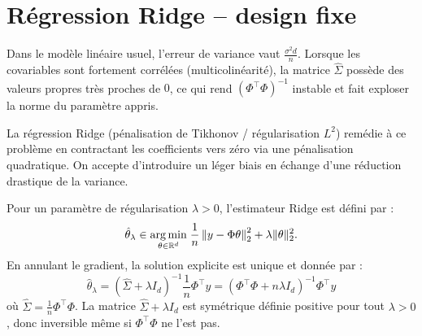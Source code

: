 
\section{Régression Ridge -- design fixe}

Dans le modèle linéaire usuel, l'erreur de variance vaut $\frac{\sigma^2 d}{n}$. Lorsque les covariables sont fortement corrélées (multicolinéarité), la matrice $\hat{\Sigma}$ possède des valeurs propres très proches de $0$, ce qui rend $(\Phi^\top \Phi)^{-1}$ instable et fait exploser la norme du paramètre appris.

La régression Ridge (pénalisation de Tikhonov / régularisation $L^2$) remédie à ce problème en contractant les coefficients vers zéro via une pénalisation quadratique. On accepte d'introduire un léger biais en échange d'une réduction drastique de la variance.

\begin{definition}
    Pour un paramètre de régularisation $\lambda > 0$, l'estimateur Ridge est défini par :
    \begin{equation}
        \hat{\theta}_\lambda \in \underset{\theta \in \mathbb{R}^d}{\arg \min} \; \frac{1}{n} \left\| y - \Phi \theta \right\|_2^2 + \lambda \|\theta\|_2^2.
    \end{equation}
    En annulant le gradient, la solution explicite est unique et donnée par :
    \begin{equation}
        \boxed{\hat{\theta}_\lambda = \left(\hat{\Sigma} + \lambda I_d\right)^{-1} \frac{1}{n} \Phi^\top y = \left(\Phi^\top \Phi + n \lambda I_d\right)^{-1} \Phi^\top y}
    \end{equation}
    où $\hat{\Sigma} = \frac{1}{n} \Phi^\top \Phi$. La matrice $\hat{\Sigma} + \lambda I_d$ est symétrique définie positive pour tout $\lambda > 0$, donc inversible même si $\Phi^\top \Phi$ ne l'est pas.
\end{definition}

